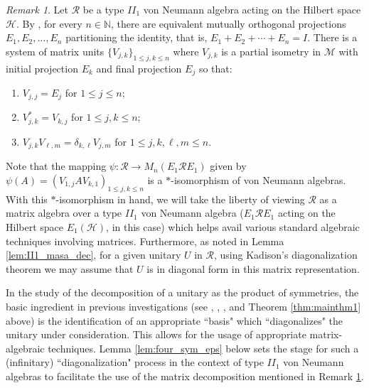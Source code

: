 \documentclass[12pt, preprint]{amsart}
\newcommand{\N}{\mathbb{N}}
\theoremstyle{definition}
\theoremstyle{remark}
\newtheorem{remark}[thm]{Remark}
\numberwithin{equation}{section}
\theoremstyle{ser}
\theoremstyle{serr}
\theoremstyle{ser}
\begin{document}
\begin{remark}
\label{rmrk:mat_alg_vNa}
Let $\mathscr{R}$ be a type $II_1$ von Neumann algebra acting on the Hilbert space $\mathscr{H}$. By \cite[Corollary 3.15]{diag_kadison}, for every $n \in \N$, there are equivalent mutually orthogonal projections $E_1, E_2, \ldots, E_n$ partitioning the identity, that is, $E_1 + E_2 + \cdots + E_n = I$. There is a system of matrix units $\{ V_{j,k} \}_{1 \le j, k \le n}$ where $V_{j,k}$ is a partial isometry in $\mathscr{M}$ with initial projection $E_k$ and final projection $E_j$ so that:
\begin{enumerate}
    \item $V_{j,j} = E_j$ for $1 \le j \le n$;
    \item $V_{j,k}^* = V_{k, j}$ for $1 \le j, k \le n$;
    \item $V_{j, k} V_{\ell, m} = \delta _{k, \ell} V_{j, m}$ for $1 \le j, k, \ell, m \le n$.
\end{enumerate}
Note that the mapping $\psi : \mathscr{R} \to M_n(E_1 \mathscr{R} E_1)$ given by $\psi(A) = (V_{1,j} A V_{k,1})_{1\le j, k \le n}$ is a $*$-isomorphism of von Neumann algebras. With this $*$-isomorphism in hand, we will take the liberty of viewing $\mathscr{R}$ as a matrix algebra over a type $II_1$ von Neumann algebra ($E_1 \mathscr{R} E_1$ acting on the Hilbert space $E_1(\mathscr{H})$, in this case) which helps avail various standard algebraic techniques involving matrices. Furthermore, as noted in Lemma \ref{lem:II1_masa_dec}, for a given unitary $U$ in $\mathscr{R}$, using Kadison's diagonalization theorem we may assume that $U$ is in diagonal form in this matrix representation.
\end{remark}






In the study of the decomposition of a unitary as the product of symmetries, the basic ingredient in previous investigations (see \cite{broise}, \cite{radjavi}, \cite{dowerk_thom}, and Theorem \ref{thm:mainthm1} above) is the identification of an appropriate ``basis" which ``diagonalizes" the unitary under consideration. This allows for the usage of appropriate matrix-algebraic techniques. Lemma \ref{lem:four_sym_eps} below sets the stage for such a (infinitary) ``diagonalization" process in the context of type $II_1$ von Neumann algebras to facilitate the use of the matrix decomposition mentioned in Remark \ref{rmrk:mat_alg_vNa}.
\end{document}
